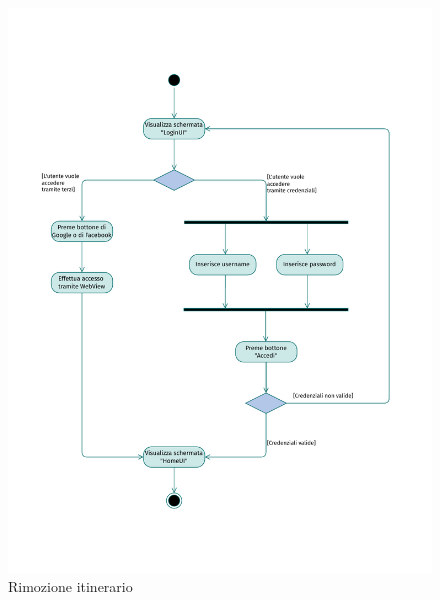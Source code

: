 \documentclass{natourDoc}
\begin{document}
\newpage
\begin{figure}[!htbp]
	\centering
	\includegraphics[width=\textwidth, page=9]{./diagrams/activity.pdf}
	\caption{Rimozione itinerario}
\end{figure}
\FloatBarrier
\end{document}
